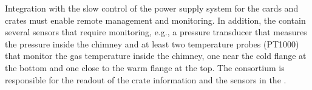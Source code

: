 Integration with the slow control of the  power supply system for the  cards and  crates %
must enable remote management and monitoring. In addition, the  contain several sensors that require monitoring, e.g.,  %
a pressure transducer that measures the pressure inside the chimney and at least two temperature probes (PT1000) that monitor the gas temperature inside the chimney, one near the cold flange at the bottom and one close to the warm flange at the top. The  consortium is responsible for the readout of the  crate information and the sensors in the . %
